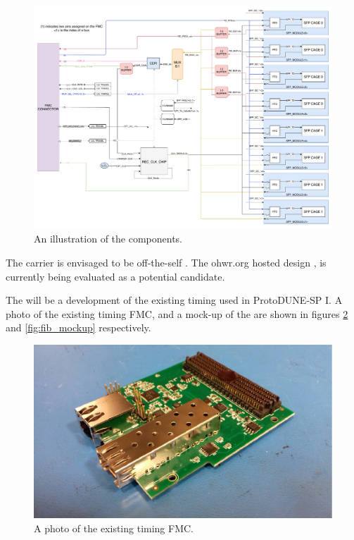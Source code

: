 \documentclass{dune}
\begin{document}
\begin{figure}[h]
\includegraphics[width=\textwidth]{pc065a_block_diagram.pdf}
\caption{An illustration of the  components.}
\label{fig:fib_and_carrier_layout}
\end{figure}

The  carrier is envisaged to be off-the-self . The ohwr.org hosted  design \cite{amc_ohwr}, is currently being evaluated as a potential candidate.

The  will be a development of the existing timing  used in ProtoDUNE-SP I. A photo of the existing timing FMC, and a mock-up of the  are shown in figures \ref{fig:timing_fmc} and \ref{fig:fib_mockup} respectively.

\begin{figure}[h]
\includegraphics[width=\textwidth]{timing_fmc.pdf}
\caption{A photo of the existing timing FMC.}
\label{fig:timing_fmc}
\end{figure}
\end{document}
